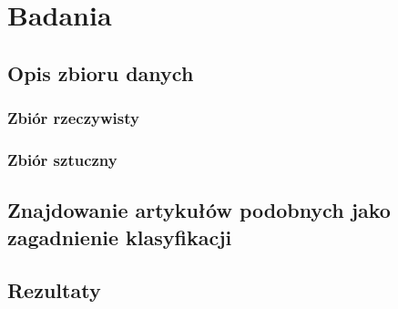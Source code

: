 \section{Badania}

\subsection{Opis zbioru danych}

\subsubsection{Zbiór rzeczywisty}

\subsubsection{Zbiór sztuczny}

\subsection{Znajdowanie artykułów podobnych jako zagadnienie klasyfikacji}

\subsection{Rezultaty}